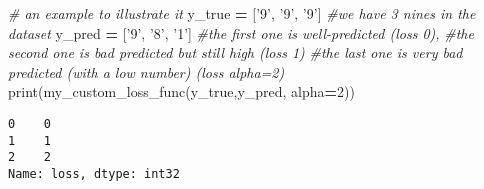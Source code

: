 \documentclass[10pt,a4paper]{article}
\newenvironment{Shaded}{\begin{snugshade}}{\end{snugshade}}
\newcommand{\BuiltInTok}[1]{#1}
\newcommand{\CommentTok}[1]{\textcolor[rgb]{0.56,0.35,0.01}{\textit{#1}}}
\newcommand{\DecValTok}[1]{\textcolor[rgb]{0.00,0.00,0.81}{#1}}
\newcommand{\NormalTok}[1]{#1}
\newcommand{\OperatorTok}[1]{\textcolor[rgb]{0.81,0.36,0.00}{\textbf{#1}}}
\newcommand{\StringTok}[1]{\textcolor[rgb]{0.31,0.60,0.02}{#1}}
\theoremstyle{break}
\begin{document}
\begin{Shaded}
\begin{Highlighting}[]
\CommentTok{# an example to illustrate it}
\NormalTok{y_true }\OperatorTok{=}\NormalTok{ [}\StringTok{'9'}\NormalTok{, }\StringTok{'9'}\NormalTok{, }\StringTok{'9'}\NormalTok{] }\CommentTok{#we have 3 nines in the dataset}
\NormalTok{y_pred }\OperatorTok{=}\NormalTok{ [}\StringTok{'9'}\NormalTok{, }\StringTok{'8'}\NormalTok{, }\StringTok{'1'}\NormalTok{] }
\CommentTok{#the first one is well-predicted (loss 0),}
\CommentTok{#the second one is bad predicted but still high (loss 1)}
\CommentTok{#the last one is very bad predicted (with a low number) (loss alpha=2)}
\BuiltInTok{print}\NormalTok{(my_custom_loss_func(y_true,y_pred, alpha}\OperatorTok{=}\DecValTok{2}\NormalTok{))}
\end{Highlighting}
\end{Shaded}

\begin{verbatim}
0    0
1    1
2    2
Name: loss, dtype: int32
\end{verbatim}
\end{document}
